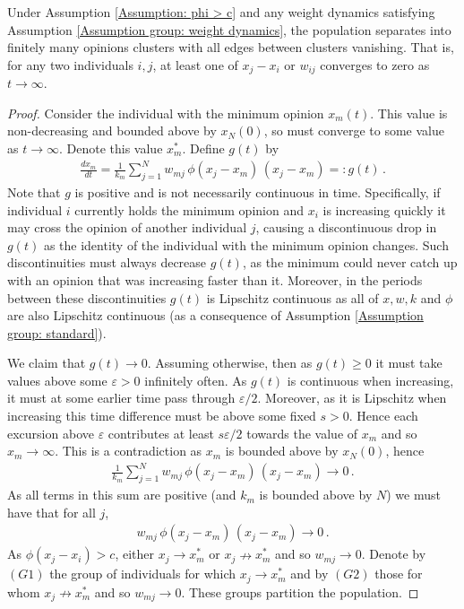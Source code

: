 \documentclass{article}
\begin{document}
\begin{theorem} \label{Thm: Exp, logistic weight dynamics}
    Under Assumption \ref{Assumption: phi > c} and any weight dynamics satisfying Assumption \ref{Assumption group: weight dynamics}, the population separates into finitely many opinions clusters with all edges between clusters vanishing. That is, for any two individuals $i,j$, at least one of $x_j - x_i$ or $w_{ij}$ converges to zero as $t\rightarrow \infty$. 
\end{theorem}
\begin{proof}    
    Consider the individual with the minimum opinion $x_m(t)$. This value is non-decreasing and bounded above by $x_N(0)$, so must converge to some value as $t\rightarrow\infty$. Denote this value $x_m^*$. Define $g(t)$ by
    \begin{align*}
        \frac{dx_m}{dt} = \frac{1}{k_m} \sum_{j=1}^N w_{mj}\,\phi(x_j - x_m)\,(x_j - x_m) =: g(t)\,.
    \end{align*}
    Note that $g$ is positive and is not necessarily continuous in time. Specifically, if individual $i$ currently holds the minimum opinion and $x_i$ is increasing quickly it may cross the opinion of another individual $j$, causing a discontinuous drop in $g(t)$ as the identity of the individual with the minimum opinion changes. Such discontinuities must always decrease $g(t)$, as the minimum could never catch up with an opinion that was increasing faster than it. Moreover, in the periods between these discontinuities $g(t)$ is Lipschitz continuous as all of $x,w,k$ and $\phi$ are also Lipschitz continuous (as a consequence of Assumption \ref{Assumption group: standard}).

    We claim that $g(t) \rightarrow0$. Assuming otherwise, then as $g(t)\geq0$ it must take values above some $\varepsilon>0$ infinitely often. As $g(t)$ is continuous when increasing, it must at some earlier time pass through $\varepsilon/2$. Moreover, as it is Lipschitz when increasing this time difference must be above some fixed $s>0$. Hence each excursion above $\varepsilon$ contributes at least $s \varepsilon/2$ towards the value of $x_m$ and so $x_m \rightarrow \infty$. This is a contradiction as $x_m$ is bounded above by $x_N(0)$, hence
    \begin{align*}
        \frac{1}{k_m} \sum_{j=1}^N w_{mj}\,\phi(x_j - x_m)\,(x_j - x_m) \rightarrow 0 \,.
    \end{align*}
    As all terms in this sum are positive (and $k_m$ is bounded above by $N$) we must have that for all $j$, 
    \begin{align*}
        w_{mj}\,\phi(x_j - x_m)\,(x_j - x_m) \rightarrow 0 \,.
    \end{align*}
    As $\phi(x_j - x_i) > c$, either $x_j \rightarrow x_m^*$  or $x_j \nrightarrow x_m^*$ and so $w_{mj} \rightarrow 0$. Denote by $(G1)$ the group of individuals for which $x_j \rightarrow x_m^*$ and by $(G2)$ those for whom $x_j \nrightarrow x_m^*$ and so $w_{mj} \rightarrow 0$. These groups partition the population. 
    

\end{proof}
\end{document}
